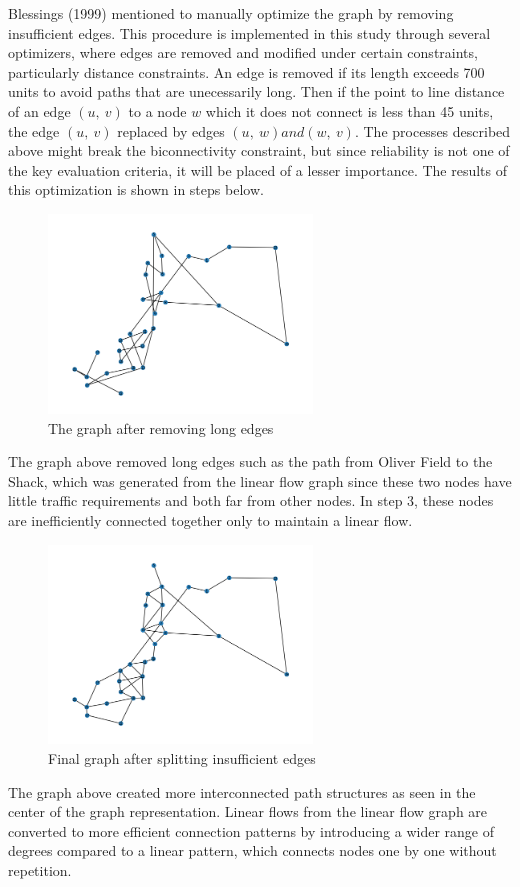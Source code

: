 \documentclass[11pt]{article}
\begin{document}
	Blessings (1999) mentioned to manually optimize the graph by removing insufficient edges. This procedure is implemented in this study through several optimizers, where edges are removed and modified under certain constraints, particularly distance constraints. An edge is removed if its length exceeds 700 units to avoid paths that are unecessarily long. Then if the point to line distance of an edge $\left(u,\ v\right)$ to a node $w$ which it does not connect is less than 45 units, the edge $\left(u,\ v\right)$ replaced by edges $\left(u,\ w\right) and \left(w,\ v\right)$. The processes described above might break the biconnectivity constraint, but since reliability is not one of the key evaluation criteria, it will be placed of a lesser importance. The results of this optimization is shown in steps below.
\begin{figure}[H]
\centering
\includegraphics[height=200px]{removelong.png}
\caption{The graph after removing long edges}
\end{figure}
\par The graph above removed long edges such as the path from Oliver Field to the Shack, which was generated from the linear flow graph since these two nodes have little traffic requirements and both far from other nodes. In step 3, these nodes are inefficiently connected together only to maintain a linear flow. 
\begin{figure}[H]
\centering
\includegraphics[height=200px]{final.png}
\caption{Final graph after splitting insufficient edges}
\end{figure} 
\par
The graph above created more interconnected path structures as seen in the center of the graph representation. Linear flows from the linear flow graph are converted to more efficient connection patterns by introducing a wider range of degrees compared to a linear pattern, which connects nodes one by one without repetition.
\end{document}
